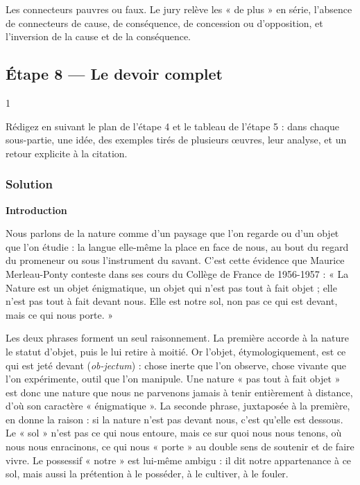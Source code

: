 \documentclass[11pt,a4paper]{article}
\begin{document}
\begin{piege}

Les connecteurs pauvres ou faux. Le jury relève les « de plus » en série, l'absence de connecteurs de cause, de conséquence, de concession ou d'opposition, et l'inversion de la cause et de la conséquence.

\end{piege}

\hypertarget{uxe9tape-8-le-devoir-complet}{%
\subsection{Étape 8 --- Le devoir complet}\label{uxe9tape-8-le-devoir-complet}}

\begin{indication}{1}

Rédigez en suivant le plan de l'étape 4 et le tableau de l'étape 5 : dans chaque sous-partie, une idée, des exemples tirés de plusieurs œuvres, leur analyse, et un retour explicite à la citation.

\end{indication}

\hypertarget{solution-7}{%
\subsubsection{Solution}\label{solution-7}}

\textbf{Introduction}

Nous parlons de la nature comme d'un paysage que l'on regarde ou d'un objet que l'on étudie : la langue elle-même la place en face de nous, au bout du regard du promeneur ou sous l'instrument du savant. C'est cette évidence que Maurice Merleau-Ponty conteste dans ses cours du Collège de France de 1956-1957 : « La Nature est un objet énigmatique, un objet qui n'est pas tout à fait objet ; elle n'est pas tout à fait devant nous. Elle est notre sol, non pas ce qui est devant, mais ce qui nous porte. »

Les deux phrases forment un seul raisonnement. La première accorde à la nature le statut d'objet, puis le lui retire à moitié. Or l'objet, étymologiquement, est ce qui est jeté devant (\emph{ob-jectum}) : chose inerte que l'on observe, chose vivante que l'on expérimente, outil que l'on manipule. Une nature « pas tout à fait objet » est donc une nature que nous ne parvenons jamais à tenir entièrement à distance, d'où son caractère « énigmatique ». La seconde phrase, juxtaposée à la première, en donne la raison : si la nature n'est pas devant nous, c'est qu'elle est dessous. Le « sol » n'est pas ce qui nous entoure, mais ce sur quoi nous nous tenons, où nous nous enracinons, ce qui nous « porte » au double sens de soutenir et de faire vivre. Le possessif « notre » est lui-même ambigu : il dit notre appartenance à ce sol, mais aussi la prétention à le posséder, à le cultiver, à le fouler.
\end{document}
